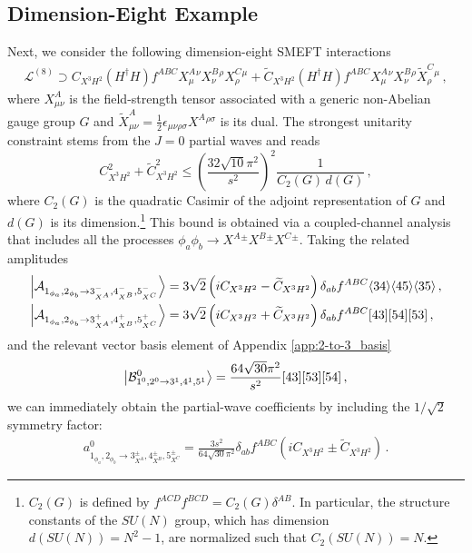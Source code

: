 \subsection{Dimension-Eight Example}

Next, we consider the following dimension-eight SMEFT interactions~\cite{Murphy:2020rsh}
%
\begin{align}
    \mathcal L^{(8)} \supset C_{X^3H^2}\left(H^\dagger H\right)f^{ABC}X^A_{\mu}{}^{\nu} X^B_{\nu}{}^{\rho} X^C_{\rho}{}^{\mu} + \widetilde C_{X^3H^2}\left(H^\dagger H\right)f^{ABC}X^A_{\mu}{}^{\nu} X^B_{\nu}{}^{\rho} \widetilde X^C_{\rho}{}^{\mu}\,,
    \label{eq:SMEFT_8}
\end{align}
%
where $X^A_{\mu\nu}$ is the field-strength tensor associated with a generic non-Abelian gauge group $G$ and $\widetilde X^A_{\mu\nu} = \frac{1}{2}\epsilon_{\mu\nu\rho\sigma}X^{A}{}^{\rho\sigma}$ is its dual.
%
The strongest unitarity constraint stems from the $J=0$ partial waves and reads
%
\begin{equation}
    C_{X^3H^2}^2+\widetilde C_{X^3H^2}^2 \le
    \left(\frac{32 \sqrt{10} \pi^2}{s^2}\right)^2 \frac{1}{C_2(G)\, d(G)}\,, 
    \label{eq:dim8unbroken}
\end{equation}
%
where $C_2(G)$ is the quadratic Casimir of the adjoint representation of $G$ and $d(G)$ is its dimension.\footnote{$C_2(G)$ is defined by $f^{ACD}f^{BCD} = C_2(G)\delta^{AB}$.
In particular, the structure constants of the $SU(N)$ group, which has dimension 
$d(SU(N)) = N^2 -1$, are normalized such that $C_2(SU(N)) = N$.}
This bound is obtained via a coupled-channel analysis that includes all the processes $\phi_a \phi_b \to X^A{}^\pm X^B{}^\pm X^C{}^\pm$. 
%
Taking the related amplitudes 
%
\begin{align}
    \ket{\mathcal A_{1_{\phi_a},2_{\phi_b} \to 3_{X^A}^-,4_{X^B}^-,5_{X^C}^-}} &= 
    3\sqrt{2}\left(iC_{X^3H^2}-\widetilde C_{X^3H^2}\right)\delta_{ab}  f^{ABC} \langle 3 4 \rangle\langle 4 5 \rangle\langle 3 5 \rangle\,, \\
    \ket{\mathcal A_{1_{\phi_a},2_{\phi_b} \to 3_{X^A}^+,4_{X^B}^+,5_{X^C}^+}} &= 
    3\sqrt{2}\left(iC_{X^3H^2}+\widetilde C_{X^3H^2}\right)\delta_{ab}  f^{ABC} \lbrack 4 3 \rbrack\lbrack 5 4 \rbrack\lbrack 5 3 \rbrack\,,
\end{align}
%
and the relevant vector basis element of Appendix \ref{app:2-to-3_basis}
%
\begin{equation}
    \ket{\mathcal B^0_{1^0,2^0 \to 3^1,4^{1},5^{1}}} = \frac{64\sqrt{30}\pi^2}{s^2}\lbrack 4 3 \rbrack\lbrack 5 3 \rbrack\lbrack 5 4 \rbrack\,,
\end{equation}
%
we can immediately obtain the partial-wave coefficients by including the $1/\sqrt{2}$ symmetry factor:
\begin{align}
    a^0_{1_{\phi_a},2_{\phi_b} \to 
    3_{X^{A}}^\pm,4_{X^{B}}^\pm,5_{X^{C}}^\pm} =
    \frac{3 s^2 }{64\sqrt{30}\pi^2}\delta_{ab}f^{ABC}\left(iC_{X^3H^2}\pm \widetilde C_{X^3H^2}\right)
    \,.
\end{align}

